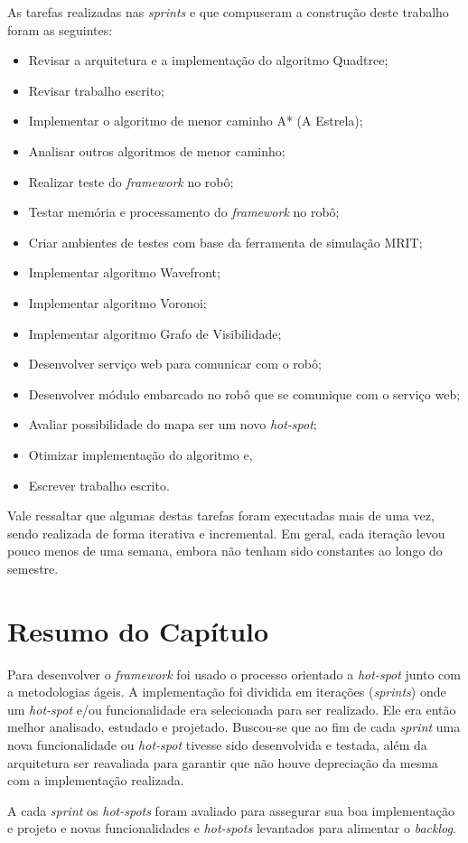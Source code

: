 As tarefas realizadas nas \textit{sprints} e que compuseram a construção deste trabalho foram as seguintes:
\begin{itemize}
  \item Revisar a arquitetura e a implementação do algoritmo Quadtree;
  \item Revisar trabalho escrito;
  \item Implementar o algoritmo de menor caminho A* (A Estrela);
  \item Analisar outros algoritmos de menor caminho;
  \item Realizar teste do \textit{framework} no robô;
  \item Testar memória e processamento do \textit{framework} no robô;
  \item Criar ambientes de testes com base da ferramenta de simulação MRIT;
  \item Implementar algoritmo Wavefront;
  \item Implementar algoritmo Voronoi;
  \item Implementar algoritmo Grafo de Visibilidade;
  \item Desenvolver serviço web para comunicar com o robô;
  \item Desenvolver módulo embarcado no robô que se comunique com o serviço web;
  \item Avaliar possibilidade do mapa ser um novo \textit{hot-spot};
  \item Otimizar implementação do algoritmo e,
  \item Escrever trabalho escrito.
\end{itemize}

Vale ressaltar que algumas destas tarefas foram executadas mais de uma vez, sendo realizada de forma iterativa e incremental. Em geral, cada iteração levou pouco menos de uma semana, embora não tenham sido constantes ao longo do semestre.

\section{Resumo do Capítulo}

Para desenvolver o \textit{framework} foi usado o processo orientado a \textit{hot-spot} junto com a metodologias ágeis. A implementação foi dividida em iterações (\textit{sprints}) onde um \textit{hot-spot} e/ou funcionalidade era selecionada para ser realizado. Ele era então melhor analisado, estudado e projetado. Buscou-se que ao fim de cada \textit{sprint} uma nova funcionalidade ou \textit{hot-spot} tivesse sido desenvolvida e testada, além da arquitetura ser reavaliada para garantir que não houve depreciação da mesma com a implementação realizada.

A cada \textit{sprint} os \textit{hot-spots} foram avaliado para assegurar sua boa implementação e projeto e novas funcionalidades e \textit{hot-spots} levantados para alimentar o \textit{backlog}.